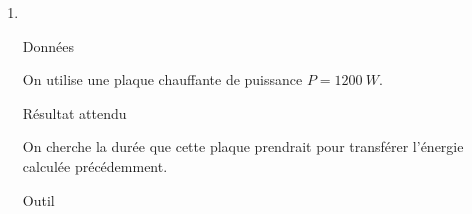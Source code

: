 \documentclass[a4paper, 12pt, final, garamond]{book}
\begin{document}
\begin{enumerate}
\begin{tcbraster}[raster columns=2, raster equal height=rows]
\begin{tcolorbox}[blankest, raster multicolumn=1, space to=\myspace]
\begin{tcbraster}[raster columns=1]
\begin{NCrapp}[]{Outil}
                    \end{NCrapp}
                \end{tcbraster}
            \end{tcolorbox}
        \end{tcbraster}
        \begin{NCexem}[]{Application}
           L'énergie à apporter $Q$ se déduit de la dimension de la capacité
           thermique massique~: $[c] = [Q]\rm⋅M^{-1}⋅\Theta^{-1}$. En appelant
           $m$ la masse du volume d'eau, par cette analyse dimensionnelle on a
           \[\boxed{Q = mc\Delta T}\]
           On a donc
           \[Q = \SI{3.3e5}{J}\quad\text{avec}\quad \left\{
                   \begin{array}{rcl}
                       m & = & \SI{1}{kg}\\
                       c & = & \SI{4.18}{J.g^{-1}.K^{-1}}\\
                       c & = & \SI{4.18e3}{J.kg^{-1}.K^{-1}}\\
                       \Delta T & = & \SI{80}{K}
                   \end{array}
           \right.\]
           et pour utiliser le coût en euros, on la converti en \si{kWh}~:
           \[Q = \SI{9.3e-2}{kWh} = \SI{1.5e-2}{\EUR}\]
        \end{NCexem}
    \item ~
        \begin{tcbraster}[raster columns=2, raster equal height=rows]
            \begin{tcolorbox}[blankest, raster multicolumn=1, space to=\myspace]
                \begin{tcbraster}[raster columns=1]
                    \begin{NCdefi}[]{Données}

                        On utilise une plaque chauffante de puissance $P =
                        \SI{1200}{W}$.

                    \end{NCdefi}
                    \begin{NCprop}[]{Résultat attendu}

                        On cherche la durée que cette plaque prendrait pour
                        transférer l'énergie calculée précédemment.

                    \end{NCprop}
                    \begin{NCrapp}[]{Outil}


\end{NCrapp}
\end{tcbraster}
\end{tcolorbox}
\end{tcbraster}
\end{enumerate}
\end{document}
